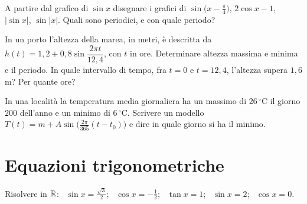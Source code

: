 \begin{esercizio}[\liv{2}]
A partire dal grafico di $\sin x$ disegnare i grafici di $\sin\bigl(x-\frac\pi4\bigr)$, $2\cos x-1$, $|\sin x|$, $\sin|x|$. Quali sono periodici, e con quale periodo?
\end{esercizio}

\begin{esercizio}[\liv{2}]
In un porto l'altezza della marea, in metri, è descritta da $h(t)=1{,}2+0{,}8\sin\dfrac{2\pi t}{12{,}4}$, con $t$ in ore. Determinare altezza massima e minima e il periodo. In quale intervallo di tempo, fra $t=0$ e $t=12{,}4$, l'altezza supera $1{,}6$ m? Per quante ore?
\end{esercizio}

\begin{esercizio}[\liv{3}]
In una località la temperatura media giornaliera ha un massimo di $26\,^\circ$C il giorno $200$ dell'anno e un minimo di $6\,^\circ$C. Scrivere un modello $T(t)=m+A\sin\bigl(\frac{2\pi}{365}(t-t_0)\bigr)$ e dire in quale giorno si ha il minimo.
\end{esercizio}

\section{Equazioni trigonometriche}

\begin{esercizio}[\liv{1}]
Risolvere in $\mathbb R$: \ $\sin x=\frac{\sqrt3}2$; \ $\cos x=-\frac12$; \ $\tan x=1$; \ $\sin x=2$; \ $\cos x=0$.
\end{esercizio}

